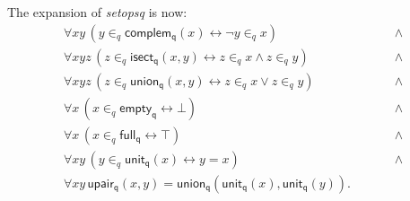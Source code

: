 \documentclass[a4paper]{article}
\newcommand{\true}{\top}
\newcommand{\false}{\bot}
\newcommand{\equi}{\leftrightarrow}
\begin{document}
The expansion of \textit{setopsq} is now:
\[\begin{array}{lllll}
\forall \mathit{x}\mathit{y} \, (\mathit{y}\in_q\mathsf{complem_{q}}(\mathit{x}) \equi  \lnot  \mathit{y}\in_q\mathit{x}) &&&&\; \land \\
\forall \mathit{x}\mathit{y}\mathit{z} \, (\mathit{z}\in_q\mathsf{isect_{q}}(\mathit{x},\mathit{y}) \equi  \mathit{z}\in_q\mathit{x} \land  \mathit{z}\in_q\mathit{y}) &&&&\; \land \\
\forall \mathit{x}\mathit{y}\mathit{z} \, (\mathit{z}\in_q\mathsf{union_{q}}(\mathit{x},\mathit{y}) \equi  \mathit{z}\in_q\mathit{x} \lor  \mathit{z}\in_q\mathit{y}) &&&&\; \land \\
\forall \mathit{x} \, (\mathit{x}\in_q\mathsf{empty_{q}} \equi  \false ) &&&&\; \land \\
\forall \mathit{x} \, (\mathit{x}\in_q\mathsf{full_{q}} \equi  \true ) &&&&\; \land \\
\forall \mathit{x}\mathit{y} \, (\mathit{y}\in_q\mathsf{unit_{q}}(\mathit{x}) \equi  \mathit{y}=\mathit{x}) &&&&\; \land \\
\forall \mathit{x}\mathit{y} \, \mathsf{upair_{q}}(\mathit{x},\mathit{y})=\mathsf{union_{q}}(\mathsf{unit_{q}}(\mathit{x}),\mathsf{unit_{q}}(\mathit{y})).
\end{array}
\]
%
%


\printindex
\end{document}
